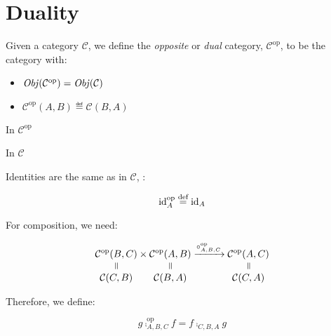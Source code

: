 \section{Duality}
\begin{definition}[Duality]
Given a category $\mathcal{C}$, we define the \emph{opposite} or \emph{dual}
category, $\mathcal{C}^{\mathrm{op}}$, to be the category with:
    \begin{itemize}
        \item $\operatorname{\mathit{Obj}}(\mathcal{C}^{\mathrm{op}}) = \operatorname{\mathit{Obj}}(\mathcal{C})$
        \item $\mathcal{C}^{\mathrm{op}}(A, B) \eqdef \mathcal{C}(B, A)$
    \end{itemize}

\begin{minipage}[t]{0.49\textwidth}
    \begin{center}
        In $\mathcal{C}^{\mathrm{op}}$

        \vspace{15pt}

    \end{center}
\end{minipage}%
\vline%
\begin{minipage}[t]{0.49\textwidth}
    \begin{center}
        In $\mathcal{C}$

        \vspace{15pt}

    \end{center}
\end{minipage}

Identities are the same as in $\mathcal{C}$, \ie:

\begin{equation*}
    \mathrm{id}_{ A }^{\mathrm{op}} \stackrel{\text{def}}{=} \mathrm{id}_{ A }
\end{equation*}

For composition, we need:

\begin{equation*}
    \equalto{\mathcal{C}^{\mathrm{op}}(B, C)}{\mathcal{C}(C, B)} \times
    \equalto{\mathcal{C}^{\mathrm{op}}(A, B)}{\mathcal{C}(B, A)} 
    \xrightarrow{\comp^{\mathrm{op}}_{A,B,C}}
    \equalto{\mathcal{C}^{\mathrm{op}}(A, C)}{\mathcal{C}(C, A)}
\end{equation*}

Therefore, we define:

\begin{equation*}
    g \comp^{\mathrm{op}}_{A,B,C} f = f \comp_{C,B,A} g
\end{equation*}
\end{definition}

